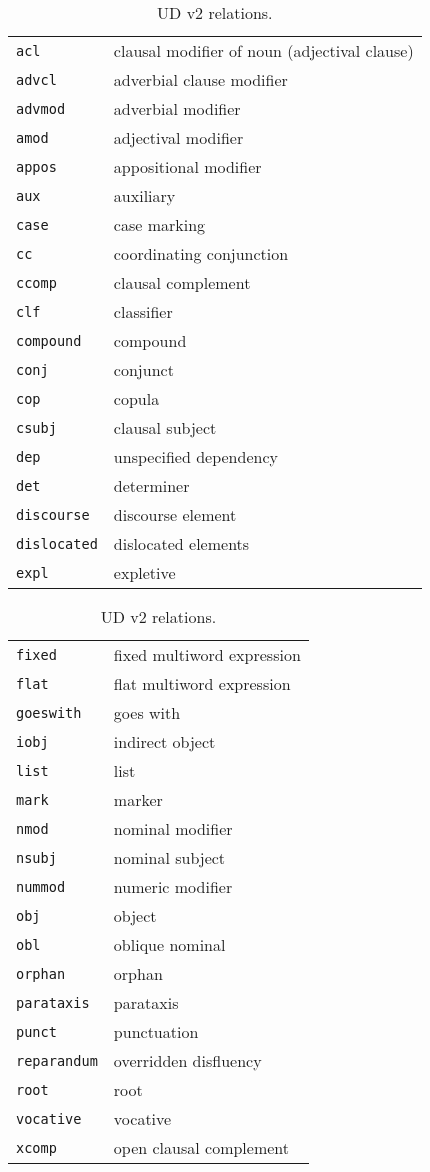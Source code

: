 \documentclass[11pt,a4paper]{article}
\begin{document}
\begin{table}[h]
\begin{tabular}{ll|}
\texttt{acl} & clausal modifier of noun (adjectival clause) \\
\texttt{advcl} & adverbial clause modifier \\
\texttt{advmod} & adverbial modifier \\
\texttt{amod} & adjectival modifier \\
\texttt{appos} & appositional modifier \\
\texttt{aux} & auxiliary \\
\texttt{case} & case marking \\
\texttt{cc} & coordinating conjunction \\
\texttt{ccomp} & clausal complement \\
\texttt{clf} & classifier \\
\texttt{compound} & compound \\
\texttt{conj} & conjunct \\
\texttt{cop} & copula \\
\texttt{csubj} & clausal subject \\
\texttt{dep} & unspecified dependency \\
\texttt{det} & determiner \\
\texttt{discourse} & discourse element \\
\texttt{dislocated} & dislocated elements \\
\texttt{expl} & expletive
\end{tabular}
\begin{tabular}{ll}
\texttt{fixed} & fixed multiword expression \\
\texttt{flat} & flat multiword expression \\
\texttt{goeswith} & goes with \\
\texttt{iobj} & indirect object \\
\texttt{list} & list \\
\texttt{mark} & marker \\
\texttt{nmod} & nominal modifier \\
\texttt{nsubj} & nominal subject \\
\texttt{nummod} & numeric modifier \\
\texttt{obj} & object \\
\texttt{obl} & oblique nominal \\
\texttt{orphan} & orphan \\
\texttt{parataxis} & parataxis \\
\texttt{punct} & punctuation \\
\texttt{reparandum} & overridden disfluency \\
\texttt{root} & root \\
\texttt{vocative} & vocative \\
\texttt{xcomp} & open clausal complement
\end{tabular}
\caption{UD v2 relations.\label{tab:ud}}
\end{table}





\end{document}
